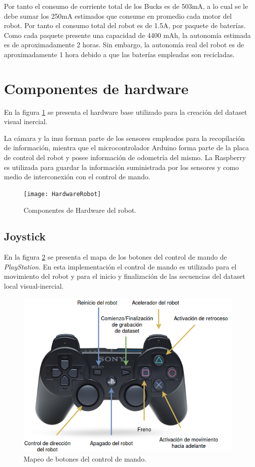 Por tanto el consumo de corriente total de los Bucks es de  503mA, a lo cual se le debe sumar los 250mA estimados que consume en promedio cada motor del robot. Por tanto el consumo total del robot es de 1.5A, por paquete de baterías. Como cada paquete presente una capacidad de 4400 mAh, la autonomía estimada es de aproximadamente 2 horas. Sin embargo, la autonomía real del robot es de aproximadamente 1 hora debido a que las baterías empleadas son recicladas.



\section{Componentes de hardware}
En la figura \ref{imagen:HardwareRobot} se presenta el hardware base utilizado para la creación del dataset visual inercial.

La cámara y la imu forman parte de los sensores empleados para la recopilación de información, mientra que el microcontrolador Arduino forma parte de la placa de control del robot y posee información de odometría del mismo. La Raspberry es utilizada para guardar la información suministrada por los sensores y como medio de interconexión con el control de mando.

\begin{figure}[H]
	\centering
	\texttt{[image: HardwareRobot]}
	\caption[Componentes de Hardware del robot]{Componentes de Hardware del robot.}
	\label{imagen:HardwareRobot}
\end{figure}

\subsection{Joystick}

En la figura \ref{imagen:Joystick} se presenta el mapa de los botones del control de mando de \textit{PlayStation}. En esta implementación el control de mando es utilizado para el movimiento del robot y para el inicio y finalización de las secuencias del dataset local visual-inercial.

\begin{figure}[H]
	\centering	
	\includegraphics[width=0.7\linewidth]{imagenes/prototipo/Joystick}
	\caption[Botones de control de mando]{Mapeo de botones del control de mando.}
	\label{imagen:Joystick}
\end{figure}

